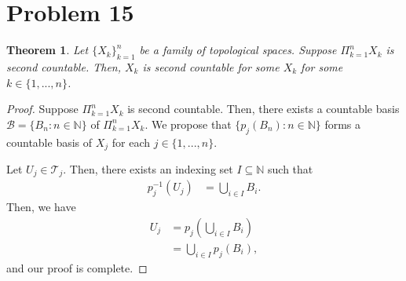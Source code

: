 \documentclass[10pt,a4paper]{article}
\theoremstyle{theorem}
\newtheorem{theorem}{Theorem}
\theoremstyle{definition}
\newcommand{\Tau}{\mathcal{T}}
\begin{document}
\section*{Problem 15}
\begin{theorem}
Let $\{X_k\}_{k=1}^n$ be a family of topological spaces. Suppose $\Pi_{k=1}^n X_k$ is second countable. Then, $X_k$ is second countable for some $X_k$ for some $k \in \{1,...,n\}$.
\end{theorem}

\begin{proof}
Suppose $\Pi_{k=1}^n X_k$ is second countable.  Then, there exists a countable basis $\mathcal{B} = \{B_n: n \in \mathbb{N}\}$ of $\Pi_{k=1}^n X_k$. We propose that $\{p_{j}(B_n): n \in \mathbb{N}\}$ forms a countable basis of $X_j$ for each $j \in \{1,...,n\}$.

Let $U_j \in \Tau_j$. Then, there exists an indexing set $I \subseteq \mathbb{N}$ such that
\begin{align*}
p_{j}^{-1}(U_j) &= \bigcup_{i\in I} B_i.
\end{align*}
Then, we have
\begin{align*}
U_j &= p_j(\bigcup_{i\in I} B_i)\\
&= \bigcup_{i\in I} p_j(B_i),
\end{align*}
and our proof is complete.
\end{proof}
\end{document}
